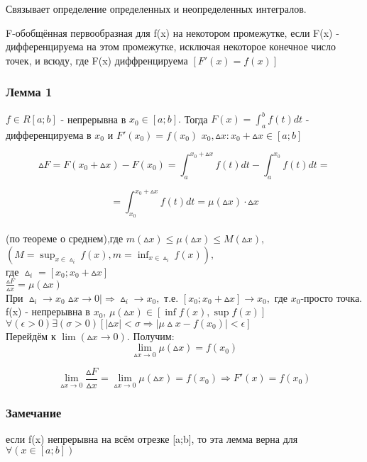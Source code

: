 Связывает определение определенных и неопределенных интегралов.
\begin{opred}
F-обобщённая первообразная для f(x) на некотором промежутке, если F(x) - дифференцируема на этом промежутке, исключая некоторое конечное число точек, и всюду, где F(x) диффренцируема $[F'(x)=f(x)]$
\end{opred}
\subsubsection{Лемма 1}
$f\in R[a;b]$ - непрерывна в $x_0\in[a;b].$ Тогда $F(x)=\int_{a}^{b}f(t)dt$ - дифференцируема в $x_0$ и $F'(x_0)=f(x_0)$
\dokvo
$x_0,\vartriangle x: x_0+\vartriangle x\in[a;b]$

$$
\vartriangle F=F(x_0+\vartriangle x)-F(x_0)=\int_{a}^{x_0+\vartriangle x}f(t)dt - \int_{a}^{x_0}f(t)dt=
$$

$$
=\int_{x_0}^{x_0+\vartriangle x}f(t)dt = \mu(\vartriangle x)\cdot\vartriangle x
$$
\\
(по теореме о среднем),где $m(\vartriangle x)\leq\mu(\vartriangle x)\leq M(\vartriangle x),$
\\
$(M=\sup_{x\in\vartriangle_i}f(x),m=\inf_{x\in\vartriangle_i}f(x)),$
\\
где $\vartriangle_i=[x_0;x_0+\vartriangle x]$
\\
$\frac{\vartriangle F}{\vartriangle x}=\mu(\vartriangle x)$
\\
При $\vartriangle_i \to x_0$  $\vartriangle x \to 0 |\Rightarrow \vartriangle_i \to x_0,$ т.е. $[x_0;x_0+\vartriangle x]\to x_0,$ где $x_0$-просто точка.
\\
f(x) - непрерывна в $x_0$, $\mu(\vartriangle x)\in[\inf f(x),\sup f(x)]$
\\
$\forall(\epsilon>0)\exists(\sigma>0)[|\vartriangle x|<\sigma\Rightarrow|\mu \vartriangle x - f(x_0)|<\epsilon]$
\\
Перейдём к $\lim (\vartriangle x \to 0).$ Получим:
$$
\lim_{\vartriangle x\to 0}\mu(\vartriangle x) = f(x_0)
$$

$$
\lim_{\vartriangle x\to 0}\frac{\vartriangle F}{\vartriangle x}=\lim_{\vartriangle x\to 0}\mu(\vartriangle x)=f(x_0)\Rightarrow F'(x)=f(x_0)
$$
\dokno

\subsubsection{Замечание}
если f(x) непрерывна на всём отрезке [a;b], то эта лемма верна для $\forall(x\in[a;b])$

